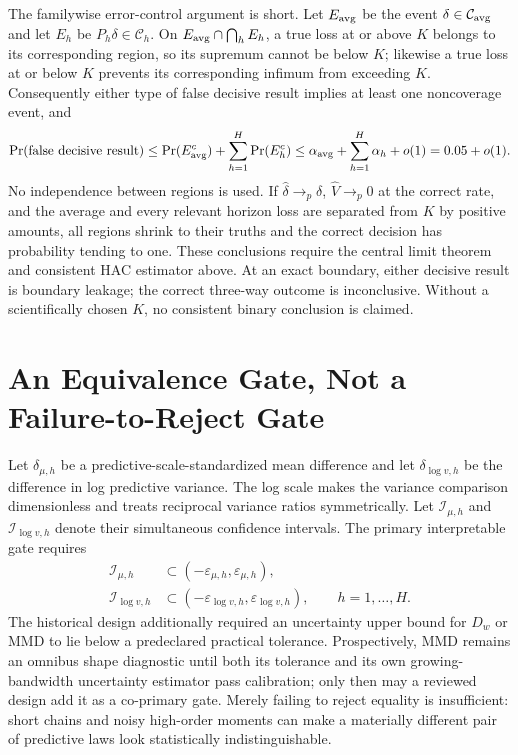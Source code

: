 The familywise error-control argument is short.  Let $E_{\rm avg}$ be the
event $\delta\in\mathcal C_{\rm avg}$ and let
$E_h$ be $P_h\delta\in\mathcal C_h$.  On
$E_{\rm avg}\cap\bigcap_hE_h$, a true loss at or above $K$ belongs to its
corresponding region, so its supremum cannot be below $K$; likewise a true
loss at or below $K$ prevents its corresponding infimum from exceeding $K$.
Consequently either type of false decisive result implies at least one
noncoverage event, and
\begin{equation}
  \Pr(\text{false decisive result})
  \leq \Pr(E_{\rm avg}^{c})+\sum_{h=1}^{H}\Pr(E_h^{c})
  \leq \alpha_{\rm avg}+\sum_{h=1}^{H}\alpha_h+o(1)=0.05+o(1).
  \label{eq:bf-ssl-lstm-split-region-union-bound}
\end{equation}
No independence between regions is used.  If $\widehat\delta\to_p\delta$,
$\widehat V\to_p0$ at the correct rate, and the average and every relevant
horizon loss are separated from $K$ by positive amounts, all regions shrink
to their truths and the correct decision has probability tending to one.
These conclusions require the central limit theorem and consistent HAC
estimator above.  At an exact boundary, either decisive result is boundary
leakage; the correct three-way outcome is inconclusive.  Without a
scientifically chosen $K$, no consistent binary conclusion is claimed.

\section{An Equivalence Gate, Not a Failure-to-Reject Gate}
\label{sec:bf-ssl-lstm-predictive-equivalence-gate}

Let $\delta_{\mu,h}$ be a predictive-scale-standardized mean difference and
let $\delta_{\log v,h}$ be the difference in log predictive variance.  The
log scale makes the variance comparison dimensionless and treats reciprocal
variance ratios symmetrically.  Let $\mathcal I_{\mu,h}$ and
$\mathcal I_{\log v,h}$ denote their simultaneous confidence intervals.  The
primary interpretable gate requires
\begin{align}
  \mathcal I_{\mu,h}
    &\subset (-\varepsilon_{\mu,h},\varepsilon_{\mu,h}),                  \\
  \mathcal I_{\log v,h}
    &\subset (-\varepsilon_{\log v,h},\varepsilon_{\log v,h}),
  \qquad h=1,\ldots,H.
  \label{eq:bf-ssl-lstm-component-equivalence}
\end{align}
The historical design additionally required an uncertainty upper bound for
$D_w$ or MMD to lie below a predeclared practical tolerance.  Prospectively,
MMD remains an omnibus shape diagnostic until both its tolerance and its own
growing-bandwidth uncertainty estimator pass calibration; only then may a
reviewed design add it as a co-primary gate.  Merely failing to reject equality
is insufficient: short chains and noisy high-order moments can make a
materially different pair of predictive laws look statistically
indistinguishable.

